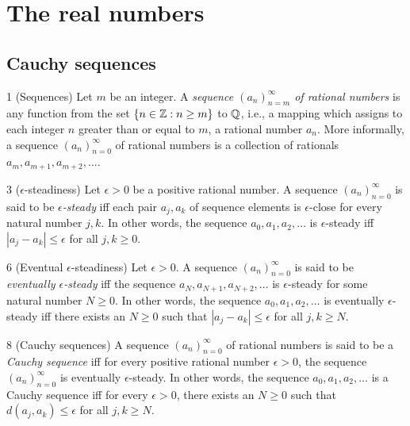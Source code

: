 \section{The real numbers}\label{a1-ch5}
\subsection{Cauchy sequences}
\begin{definition}{1}
    \label{rat-sequence}
    (Sequences) Let $m$ be an integer. A \emph{sequence $(a_n)_{n=m}^{\infty}$ of
    rational numbers} is any function from the set $\{n \in \mathbb{Z}: n \geq m\}$ to
    $\mathbb{Q}$, i.e., a mapping which assigns to each integer $n$ greater than or equal
    to $m$, a rational number $a_n$. More informally, a sequence $(a_n)_{n=0}^{\infty}$
    of rational numbers is a collection of rationals $a_m, a_{m+1}, a_{m+2}, \ldots$.
\end{definition}

\begin{definition}{3}
    \label{eps-steady}
    ($\epsilon$-steadiness) Let $\epsilon > 0$ be a positive rational number. A sequence
    $(a_n)_{n=0}^{\infty}$ is said to be \emph{$\epsilon$-steady} iff each pair $a_j, a_k$
    of sequence elements is $\epsilon$-close for every natural number $j, k$. In other
    words, the sequence $a_0, a_1, a_2, \ldots$ is $\epsilon$-steady iff $|a_j - a_k| \leq \epsilon$
    for all $j, k \geq 0$.
\end{definition}

\begin{definition}{6}
    \label{eventually-eps-steady}
    (Eventual $\epsilon$-steadiness) Let $\epsilon > 0$. A sequence $(a_n)_{n=0}^{\infty}$ is
    said to be \emph{eventually $\epsilon$-steady} iff the sequence $a_N, a_{N+1}, a_{N+2}, \ldots$
    is $\epsilon$-steady for some natural number $N \geq 0$. In other words, the sequence
    $a_0, a_1, a_2, \ldots$ is eventually $\epsilon$-steady iff there exists an $N \geq 0$
    such that $|a_j - a_k| \leq \epsilon$ for all $j, k \geq N$.
\end{definition}

\begin{definition}{8}
    \label{rat-cauchy-sequence}
    (Cauchy sequences) A sequence $(a_n)_{n=0}^{\infty}$ of rational numbers is said
    to be a \emph{Cauchy sequence} iff for every positive rational number $\epsilon > 0$,
    the sequence $(a_n)_{n=0}^{\infty}$ is eventually $\epsilon$-steady. In other words,
    the sequence $a_0, a_1, a_2, \ldots$ is a Cauchy sequence iff for every $\epsilon > 0$,
    there exists an $N \geq 0$ such that $d(a_j, a_k) \leq \epsilon$ for all $j, k \geq N$.
\end{definition}

